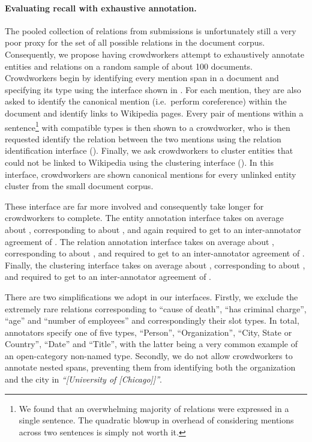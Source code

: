 \paragraph{Evaluating recall with exhaustive annotation.}
The pooled collection of relations from submissions is unfortunately still a very poor proxy for the set of all possible relations in the document corpus.
Consequently, we propose having crowdworkers attempt to exhaustively annotate entities and relations on a random sample of about 100 documents.
Crowdworkers begin by identifying every mention span in a document and specifying its type using the interface shown in . For each mention, they are also asked to identify the canonical mention (i.e.\ perform coreference) within the document and identify links to Wikipedia pages.
Every pair of mentions within a sentence\footnote{
  We found that an overwhelming majority of relations were expressed in a single sentence.
  The quadratic blowup in overhead of considering mentions across two sentences is simply not worth it.}
  with compatible types is then shown to a crowdworker, who is then requested identify the relation between the two mentions using the relation identification interface ().
  Finally, we ask crowdworkers to cluster entities that could not be linked to Wikipedia using the clustering interface ().
  In this interface, crowdworkers are shown canonical mentions for every unlinked entity cluster from the small document corpus.

These interface are far more involved and consequently take longer for crowdworkers to complete.
The entity annotation interface takes on average about , corresponding to about , and 
again required  to get to an inter-annotator agreement of .
The relation annotation interface takes on average about , corresponding to about , and required  to get to an inter-annotator agreement of .
Finally, the clustering interface takes on average about , corresponding to about , and required  to get to an inter-annotator agreement of .

There are two simplifications we adopt in our interfaces.
Firstly, we exclude the extremely rare relations corresponding to ``cause of death'', ``has criminal charge'', ``age'' and ``number of employees'' and correspondingly their slot types.
In total, annotators specify one of five types, ``Person'', ``Organization'', ``City, State or Country'', ``Date'' and ``Title'', with the latter being a very common example of an open-category non-named type.
Secondly, we do not allow crowdworkers to annotate nested spans, preventing them from identifying both the organization and the city in \textit{``[University of [Chicago]]''}. 

